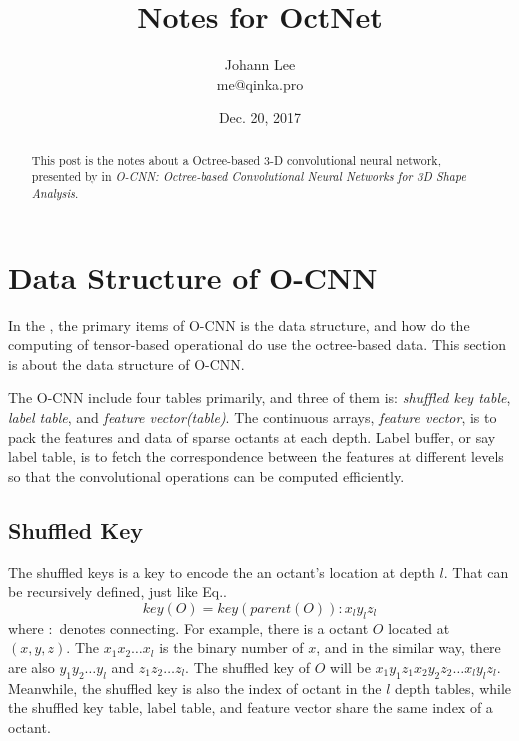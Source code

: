 \documentclass[border=0.5in]{blog}
\title{Notes for OctNet}
\author{Johann Lee \\ me@qinka.pro}
\date{Dec. 20, 2017}
\begin{document}
    
    \maketitle
    
    \begin{abstract}
        This post is the notes about a Octree-based 3-D convolutional neural network, presented by
        \citep{DBLP:journals/tog/WangLGST17} in \textit{O-CNN: Octree-based Convolutional Neural Networks for 3D Shape Analysis}.
    \end{abstract}

    \tableofcontents
    
    \section{Data Structure of O-CNN}
    \label{sec:o-cnn-ds}
    
    In the \citep{DBLP:journals/tog/WangLGST17}, the primary items of O-CNN is the data structure,
    and how do the computing of tensor-based operational do use the octree-based data.
    This section is about the data structure of O-CNN.
    
    The O-CNN include four tables primarily, and three of them is:
    \textit{shuffled key table}, \textit{label table}, and \textit{feature vector(table)}.
    The continuous arrays, \textit{feature vector}, is to pack the features and data of
    sparse octants at each depth. Label buffer, or say label table, is to fetch the correspondence
    between the features at different levels so that the convolutional operations can be computed
    efficiently.
    
    \subsection{Shuffled Key}
    \label{sec:o-cnn-ds:sk}
    
    The shuffled keys is a key to encode the an octant's location at depth $l$.
    That can be recursively defined, just like Eq..
    \begin{equation}
        \label{eq:shuffled-key-rec}
        key\left(O\right) = key\left(parent\left(O\right)\right):x_ly_lz_l
    \end{equation}
    where $:$ denotes connecting. For example, there is a octant $O$ located at $(x,y,z)$.
    The $x_1x_2\dots x_l$ is the binary number of $x$, and in the similar way, there are also
    $y_1y_2\dots y_l$ and $z_1z_2\dots z_l$. The shuffled key of $O$ will be $x_1y_1z_1x_2y_2z_2\dots x_ly_lz_l$. Meanwhile, the shuffled key is also the index of octant
    in the $l$ depth tables, while the shuffled key table, label table, and feature vector share 
    the same index of a octant.
    
\end{document}
